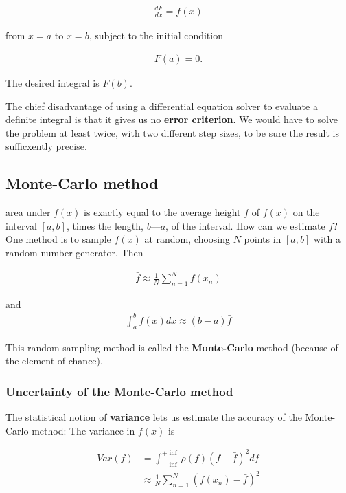 \begin{align}
\frac{dF}{dx} = f(x)
\end{align}

from $x = a$ to $x = b$, subject to the initial condition

\begin{align}
F(a) = 0.
\end{align}

The desired integral is $F(b)$.

The chief disadvantage of using a differential equation solver to evaluate a definite integral is that it gives us no \textbf{error criterion}. We would have to solve the problem at least twice, with two different step sizes, to be sure the result is sufficxently precise.

\subsection{Monte-Carlo method}
 area under $f(x)$ is exactly equal to the average height $\bar{f}$ of $f(x)$ on the interval $[a, b]$, times the length, $b—a$, of the interval. How can we estimate $\bar{f}$? One method is to sample $f(x)$ at random, choosing $N$ points in $[a,b]$ with a random number generator. Then

\begin{align}
\bar{f} \approx \frac{1}{N} \sum_{n=1}^{N} f(x_n)
\end{align}

and
\begin{align}
\int_{a}^{b} f(x) dx \approx (b-a)\bar{f}
\end{align}

This random-sampling method is called the \textbf{Monte-Carlo} method (because of the element of chance).

\subsubsection{Uncertainty of the Monte-Carlo method}
The statistical notion of \textbf{variance} lets us estimate the accuracy of the Monte-Carlo method: The variance in $f(x)$ is

\begin{align}
Var(f) &= \int_{-\inf}^{+\inf} \rho(f) (f- \bar{f})^2 df \\
&\approx \frac{1}{N} \sum_{n=1}^{N} (f(x_n) - \bar{f})^2
\end{align}

